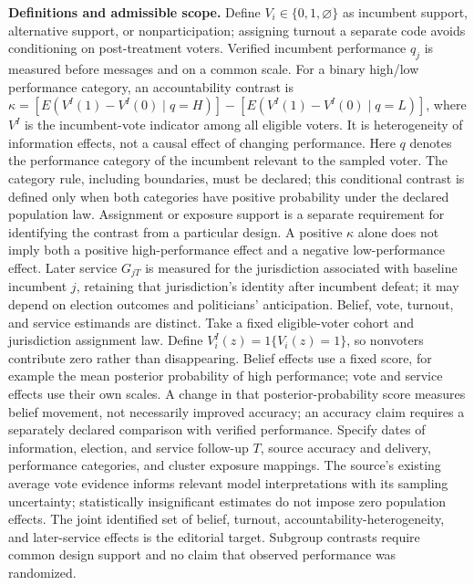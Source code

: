 \documentclass[11pt,a4paper]{article}
\begin{document}
\textbf{Definitions and admissible scope.} Define \(V_i\in\{0,1,\varnothing\}\) as incumbent support, alternative support, or nonparticipation; assigning turnout a separate code avoids conditioning on post-treatment voters. Verified incumbent performance \(q_j\) is measured before messages and on a common scale. For a binary high/low performance category, an accountability contrast is \(\kappa=[E(V^I(1)-V^I(0)\mid q=H)]-[E(V^I(1)-V^I(0)\mid q=L)]\), where \(V^I\) is the incumbent-vote indicator among all eligible voters. It is heterogeneity of information effects, not a causal effect of changing performance. Here \(q\) denotes the performance category of the incumbent relevant to the sampled voter. The category rule, including boundaries, must be declared; this conditional contrast is defined only when both categories have positive probability under the declared population law. Assignment or exposure support is a separate requirement for identifying the contrast from a particular design. A positive \(\kappa\) alone does not imply both a positive high-performance effect and a negative low-performance effect. Later service \(G_{jT}\) is measured for the jurisdiction associated with baseline incumbent \(j\), retaining that jurisdiction's identity after incumbent defeat; it may depend on election outcomes and politicians' anticipation. Belief, vote, turnout, and service estimands are distinct. Take a fixed eligible-voter cohort and jurisdiction assignment law. Define \(V_i^I(z)=1\{V_i(z)=1\}\), so nonvoters contribute zero rather than disappearing. Belief effects use a fixed score, for example the mean posterior probability of high performance; vote and service effects use their own scales. A change in that posterior-probability score measures belief movement, not necessarily improved accuracy; an accuracy claim requires a separately declared comparison with verified performance. Specify dates of information, election, and service follow-up \(T\), source accuracy and delivery, performance categories, and cluster exposure mappings. The source's existing average vote evidence informs relevant model interpretations with its sampling uncertainty; statistically insignificant estimates do not impose zero population effects. The joint identified set of belief, turnout, accountability-heterogeneity, and later-service effects is the editorial target. Subgroup contrasts require common design support and no claim that observed performance was randomized.
\end{document}
